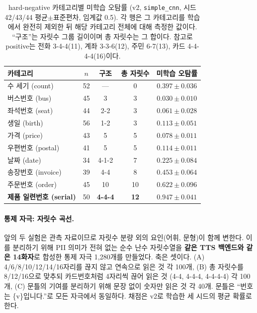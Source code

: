 \documentclass[11pt]{article}
\renewcommand{\emph}[1]{\textbf{#1}}
\begin{document}
\begin{table}[!htbp]
\centering
\caption{hard-negative 카테고리별 미학습 오탐률 (v2, \texttt{simple\_cnn}, 시드 42/43/44
평균$\pm$표준편차, 임계값 0.5). 각 행은 그 카테고리를 학습에서 완전히 제외한 뒤 해당
카테고리 전체에 대해 측정한 값이다. ``구조''는 자릿수 그룹 길이이며 총 자릿수는 그 합이다.
참고로 positive는 전화 3-4-4(11), 계좌 3-3-6(12), 주민 6-7(13), 카드 4-4-4-4(16)이다.}
\label{tab:heldcat}
\small
\setlength{\tabcolsep}{5pt}
\begin{tabular}{lcccc}
\toprule
카테고리 & $n$ & 구조 & 총 자릿수 & 미학습 오탐률 \\
\midrule
수 세기 (count)     & 52 & --- & 0 & $0.397\pm0.036$ \\
버스번호 (bus)      & 45 & 3      & 3 & $0.030\pm0.010$ \\
좌석번호 (seat)     & 44 & 2-2    & 3 & $0.061\pm0.028$ \\
생일 (birth)        & 56 & 1-2    & 3 & $0.113\pm0.051$ \\
가격 (price)        & 43 & 5      & 5 & $0.078\pm0.011$ \\
우편번호 (postal)   & 41 & 5      & 5 & $0.114\pm0.011$ \\
날짜 (date)         & 34 & 4-1-2  & 7 & $0.225\pm0.084$ \\
송장번호 (invoice)  & 39 & 4-4    & 8 & $0.453\pm0.064$ \\
주문번호 (order)    & 45 & 10     & 10 & $0.622\pm0.096$ \\
\textbf{제품 일련번호 (serial)} & 50 & \textbf{4-4-4} & \textbf{12} & $\mathbf{0.947\pm0.041}$ \\
\bottomrule
\end{tabular}
\end{table}

\paragraph{통제 자극: 자릿수 곡선.}
앞의 두 실험은 관측 자료이므로 자릿수 분량 외의 요인(어휘, 문형)이 함께 변한다. 이를 분리하기
위해 PII 의미가 전혀 없는 순수 난수 자릿수열을 \emph{같은 TTS 백엔드와 같은 14화자}로 합성한
통제 자극 1{,}280개를 만들었다. 축은 셋이다. (A) 4/6/8/10/12/14/16자리를 끊지 않고 연속으로
읽은 것 각 100개, (B) 총 자릿수를 8/12/16으로 맞추되 카드번호처럼 4자리씩 끊어 읽은 것
(4-4, 4-4-4, 4-4-4-4) 각 100개, (C) 문틀의 기여를 분리하기 위해 문장 없이 숫자만 읽은 것 각
40개. 문틀은 ``번호는 \{v\}입니다.''로 모든 자극에서 동일하다. 채점은 v2로 학습한 세 시드의
평균 확률로 한다.
\end{document}
